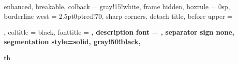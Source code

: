

\newcommand{\notiz}[1]{\begin{notizz}{}{}\begin{center}
			{\color{miugray2!50!miudiutex}#1} \end{center}\end{notizz}}
\newcommand{\zit}[2]{\begin{zitat*}{#1}{}\small #2 \end{zitat*}}

\newcommand{\frage}[2]{\begin{qst*}{#1}{}\small #2 \end{qst*}}

\newcommand{\unten}{\end{center} \tcblower \begin{center}}


\newcommand*\circled[1]{\tikz[baseline=(char.base)]{
            \node[shape=circle,draw,inner sep=0.5pt,miudiutex] (char) {\tiny #1};}}
            
\newcommand{\miusquare}{{\color{miugray2!50}\scriptsize $\blacksquare$}~}
\newcommand{\miusquarp}{{\color{petunidin!50}\scriptsize $\blacktriangleright$}~}
\newcommand{\niu}{\item[\miusquare]}
\newcommand{\nip}{\item[\miusquarp]}


\newcommand{\pps}{\par \vspace*{1mm}}
\newcommand{\pp}{\par \vspace*{3mm}}
\newcommand{\ppbig}{\par \vspace*{8mm}}
\newcommand{\pphuge}{\par \vspace*{10mm}}


{%
	enhanced,
	breakable,
	colback = gray!15!white,
	frame hidden,
	boxrule = 0sp,
	borderline west = {2.5pt}{0pt}{red!70},
	sharp corners,
	detach title,
	before upper = \tcbtitle\par\smallskip,
	coltitle = black,
	fonttitle = \bfseries\sffamily,
	description font = \mdseries,
	separator sign none,
	segmentation style={solid, gray!50!black},
}
{th}




